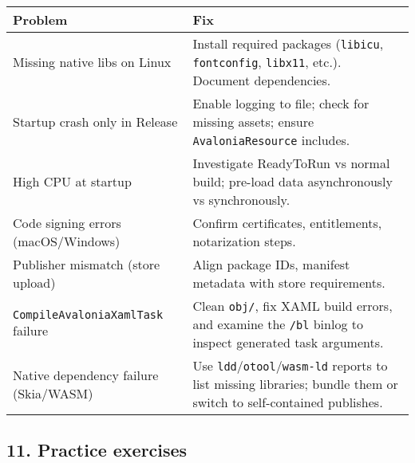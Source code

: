 \begin{longtable}[]{@{}
  >{\raggedright\arraybackslash}p{}
  >{\raggedright\arraybackslash}p{}@{}}
\toprule\noalign{}
\begin{minipage}[b]{\linewidth}\raggedright
Problem
\end{minipage} & \begin{minipage}[b]{\linewidth}\raggedright
Fix
\end{minipage} \\
\midrule\noalign{}
\endhead
\bottomrule\noalign{}
\endlastfoot
Missing native libs on Linux & Install required packages
(\passthrough{\lstinline!libicu!}, \passthrough{\lstinline!fontconfig!},
\passthrough{\lstinline!libx11!}, etc.). Document dependencies. \\
Startup crash only in Release & Enable logging to file; check for
missing assets; ensure \passthrough{\lstinline!AvaloniaResource!}
includes. \\
High CPU at startup & Investigate ReadyToRun vs normal build; pre-load
data asynchronously vs synchronously. \\
Code signing errors (macOS/Windows) & Confirm certificates,
entitlements, notarization steps. \\
Publisher mismatch (store upload) & Align package IDs, manifest metadata
with store requirements. \\
\passthrough{\lstinline!CompileAvaloniaXamlTask!} failure & Clean
\passthrough{\lstinline!obj/!}, fix XAML build errors, and examine the
\passthrough{\lstinline!/bl!} binlog to inspect generated task
arguments. \\
Native dependency failure (Skia/WASM) & Use
\passthrough{\lstinline!ldd!}/\passthrough{\lstinline!otool!}/\passthrough{\lstinline!wasm-ld!}
reports to list missing libraries; bundle them or switch to
self-contained publishes. \\
\end{longtable}

\subsection{11. Practice exercises}\label{practice-exercises-20}

